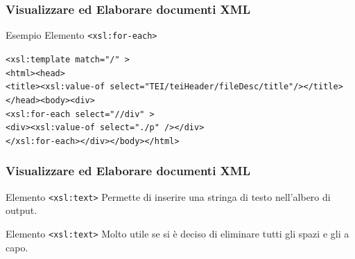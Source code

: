 \begin{frame}
    \frametitle{Visualizzare ed Elaborare documenti XML}
    \addtocounter{nframe}{1}
    

     \begin{block}{Esempio Elemento \texttt{<xsl:for-each>}}
        
        \texttt{<xsl:template match="/" >}
        \\\texttt{<html><head>}
        \\\texttt{<title><xsl:value-of select="TEI/teiHeader/fileDesc/title"/></title>}
        \\\texttt{</head><body><div>}
        \\\texttt{<xsl:for-each select="//div" >}
        \\\texttt{<div><xsl:value-of select="./p" /></div>}
        \\\texttt{</xsl:for-each></div></body></html>}
     \end{block}
    
\end{frame}




\begin{frame}
    \frametitle{Visualizzare ed Elaborare documenti XML}
    \addtocounter{nframe}{1}
    

     \begin{block}{Elemento \texttt{<xsl:text>}}
        Permette di inserire una stringa di testo nell’albero di output.
     \end{block}

     \begin{block}{Elemento \texttt{<xsl:text>}}
        Molto utile se si è deciso di eliminare tutti gli spazi e gli a capo.
     \end{block}
     

\end{frame}

